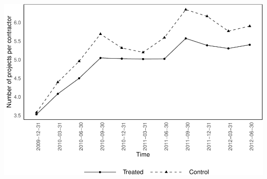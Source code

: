 \documentclass[
]{article}
\begin{document}
\includegraphics{qp_first_pc_delay-2_files/figure-latex/num_projects_1-1.pdf}
\end{document}
